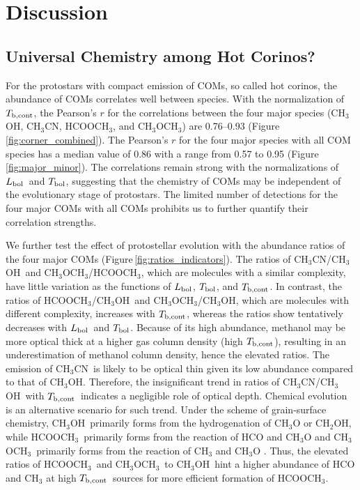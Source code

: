 \documentclass[twocolumn]{aastex62}
\newcommand{\lbol}{\mbox{$L_{\rm bol}$}}
\newcommand{\tbol}{\mbox{$T_{\rm bol}$}}
\newcommand{\tbc}{\mbox{$T_{\rm b, cont}$}}
\newcommand{\methylformate}{\mbox{HCOOCH$_{3}$}}
\newcommand{\methanol}{\mbox{CH$_{3}$OH}}
\newcommand{\dimethylether}{\mbox{CH$_{3}$OCH$_{3}$}}
\newcommand{\methylcyanide}{\mbox{CH$_{3}$CN}}
\begin{document}
\section{Discussion}
\subsection{Universal Chemistry among Hot Corinos?}
For the protostars with compact emission of COMs, so called hot corinos, the abundance of COMs correlates well between species.  With the normalization of \tbc, the Pearson's $r$ for the correlations between the four major species (\methanol, \methylcyanide, \methylformate, and \dimethylether) are 0.76--0.93 (Figure\,\ref{fig:corner_combined}).  The Pearson's $r$ for the four major species with all COM species has a median value of 0.86 with a range from 0.57 to 0.95 (Figure\,\ref{fig:major_minor}).  The correlations remain strong with the normalizations of \lbol\ and \tbol, suggesting that the chemistry of COMs may be independent of the evolutionary stage of protostars.  The limited number of detections for the four major COMs with all COMs prohibits us to further quantify their correlation strengths.

We further test the effect of protostellar evolution with the abundance ratios of the four major COMs (Figure\,\ref{fig:ratios_indicators}).  The ratios of \methylcyanide/\methanol\ and \dimethylether/\methylformate, which are molecules with a similar complexity, have little variation as the functions of \lbol, \tbol, and \tbc.  In contrast, the ratios of \methylformate/\methanol\ and \dimethylether/\methanol, which are molecules with different complexity, increases with \tbc, whereas the ratios show tentatively decreases with \lbol\ and \tbol.  Because of its high abundance, methanol may be more optical thick at a higher gas column density (high \tbc), resulting in an underestimation of methanol column density, hence the elevated ratios.  The emission of \methylcyanide\ is likely to be optical thin given its low abundance compared to that of \methanol.  Therefore, the insignificant trend in ratios of \methylcyanide/\methanol\ with \tbc\ indicates a negligible role of optical depth.  Chemical evolution is an alternative scenario for such trend.  Under the scheme of grain-surface chemistry, \methanol\ primarily forms from the hydrogenation of CH$_3$O or CH$_2$OH, while \methylformate\ primarily forms from the reaction of HCO and CH$_3$O and \dimethylether\ primarily forms from the reaction of CH$_3$ and CH$_3$O \citep{2008ApJ...682..283G}.  Thus, the elevated ratios of \methylformate\ and \dimethylether\ to \methanol\ hint a higher abundance of HCO and CH$_3$ at high \tbc\ sources for more efficient formation of \methylformate.
\end{document}
